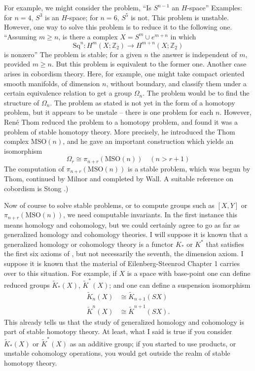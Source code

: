 \documentclass[../main]{subfiles}
\begin{document}
For example, we might consider the problem, ``Is $S^{n - 1}$ an $H$-space'' Examples: for $n = 4$, $S^3$ is an $H$-space; for $n = 6$, $S^5$ is not. This problem is unstable. However, one way to solve this problem is to reduce it to the following one. ``Assuming $m \ge n$, is there a complex $X = S^m \cup e^{m + n}$ in which 
\[ \mathrm{Sq}^n \colon H^m(X; \mathbb{Z}_2) \to H^{m + n}(X; \mathbb Z_2) \] is nonzero'' The problem is stable; for a given $n$ the answer is independent of $m$, provided $m \ge n$. But this problem is equivalent to the former one.
Another case arises in cobordism theory. Here, for example, one might take compact oriented smooth manifolds, of dimension $n$, without boundary, and classify them under a certain equivalence relation to get a group $\Omega_n$. The problem would be to find the structure of $\Omega_n$. The problem as stated is not yet in the form of a homotopy problem, but it appears to be unstale -- there is one problem for each $n$. However, Ren\'e Thom reduced the problem to a homotopy problem, and found it was a problem of stable homotopy theory. More precisely, he introduced the Thom complex $\mathrm{MSO}(n)$, and he gave an important construction which yields an isomorphism \[ \Omega_r \cong \pi_{n + r}(\mathrm{MSO}(n)) \quad (n > r + 1)\]
The computation of $\pi_{n + r}(\mathrm{MSO}(n))$ is a stable problem, which was begun by Thom, continued by Milnor and completed by Wall. A suitable reference on cobordism is Stong \cite{stong2}.) 

Now of course to solve stable problems, or to compute groups such as $[X, Y]$ or $\pi_{n + r}(\mathrm{MSO}(n))$, we need computable invariants. In the first instance this means homology and cohomology, but we could certainly agree to go as far as generalized homology and cohomology theories. I will suppose it is known that a generalized homology or cohomology theory is a functor $K_*$ or $K^*$ that satisfies the first six axioms of , but not necessarily the seventh, the dimension axiom. I suppose it is known that the material of Eilenberg-Steenrod Chapter 1 carries over to this situation. For example, if $X$ is a space with base-point one can define reduced groups $\tilde K_*(X)$, $\tilde K^*(X)$; and one can define a suspension isomorphism
\begin{align*}
    \tilde K_n(X) &\cong \tilde K_{n + 1}(SX)\\
    \tilde K^n(X) &\cong \tilde K^{n + 1}(SX).
\end{align*}
This already tells us that the study of generalized homology and cohomology is part of stable homotopy theory. At least, what I said is true if you consider $\tilde K_*(X)$ or $\tilde K^*(X)$ as an additive group; if you started to use products, or unstable cohomology operations, you would get outside the realm of stable homotopy theory.
\end{document}
